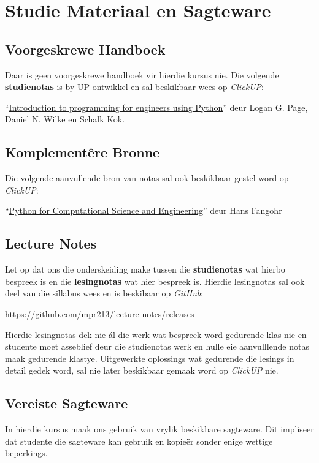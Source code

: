 \section{Studie Materiaal en Sagteware}
    \subsection{Voorgeskrewe Handboek}
        Daar is geen voorgeskrewe handboek vir hierdie kursus nie. Die volgende
        \textbf{studienotas} is by UP ontwikkel en sal beskikbaar wees op
        \textit{ClickUP}:

        ``\underline{Introduction to programming for engineers using Python}''
        deur Logan G. Page, Daniel N. Wilke en Schalk Kok.

    \subsection{Komplement\^{e}re Bronne}
        Die volgende aanvullende bron van notas sal ook beskikbaar gestel word
        op \textit{ClickUP}:

        ``\underline{Python for Computational Science and Engineering}'' deur
        Hans Fangohr

    \subsection{Lecture Notes}
        Let op dat ons die onderskeiding make tussen die \textbf{studienotas}
        wat hierbo bespreek is en die \textbf{lesingnotas} wat hier bespreek
        is. Hierdie lesingnotas sal ook deel van die sillabus wees en is
        beskibaar op \textit{GitHub}:

        \url{https://github.com/mpr213/lecture-notes/releases}

        Hierdie lesingnotas dek nie \'{a}l die werk wat bespreek word gedurende
        klas nie en studente moet asseblief deur die studienotas werk en hulle
        eie aanvulllende notas maak gedurende klastye. Uitgewerkte oplossings
        wat gedurende die lesings in detail gedek word, sal nie later
        beskikbaar gemaak word op \textit{ClickUP} nie.

    \subsection{Vereiste Sagteware}
        In hierdie kursus maak ons gebruik van vrylik beskikbare sagteware.
        Dit impliseer dat studente die sagteware kan gebruik en kopie\"er
        sonder enige wettige beperkings.

